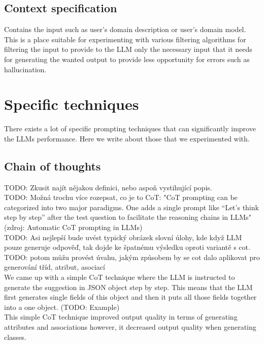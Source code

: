 \subsection{Context specification}
Contains the input such as user's domain description or user's domain model. This is a place suitable for experimenting with various filtering algorithms for filtering the input to provide to the LLM only the necessary input that it needs for generating the wanted output to provide less opportunity for errors such as hallucination.


\section{Specific techniques}

There exists a lot of specific prompting techniques that can significantly improve the LLMs performance. Here we write about those that we experimented with.


\subsection{Chain of thoughts}

TODO: Zkusit najít nějakou definici, nebo aspoň vystihující popis. \\

TODO: Možná trochu více rozepsat, co je to CoT: "CoT prompting can be categorized into two major paradigms. One adds a single prompt like “Let’s think step by step”
 after the test question to facilitate the reasoning chains in LLMs" (zdroj: Automatic CoT prompting in LLMs) \\

TODO: Asi nejlepší bude uvést typický obrázek slovní úlohy, kde když LLM pouze generuje odpověď, tak dojde ke špatnému výsledku oproti variantě s cot. \\

TODO: potom můžu provést úvahu, jakým způsobem by se cot dalo aplikovat pro generování tříd, atribut, asociací \\

We came up with a simple CoT technique where the LLM is instructed to generate the  suggestion in JSON object step by step. This means that the LLM first generates single fields of this object and then it puts all those fields together into a one object. (TODO: Example) \\

This simple CoT technique improved output quality in terms of generating attributes and associations however, it decreased output quality when generating classes. \\

